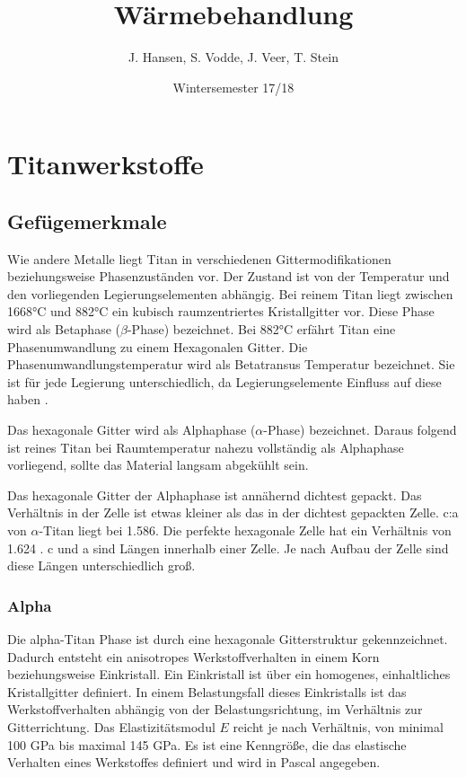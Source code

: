 \documentclass[a4paper, singlepage, 11pt]{tubsreprt}
\title{Wärmebehandlung}
\date{Wintersemester 17/18}
\author{J. Hansen, S. Vodde,
 J. Veer, T. Stein}
\begin{document}
\maketitle
\tableofcontents
\chapter{Titanwerkstoffe}

\section{Gefügemerkmale}
Wie andere Metalle liegt Titan in verschiedenen Gittermodifikationen beziehungsweise Phasenzuständen vor. Der Zustand ist von der Temperatur und den vorliegenden Legierungselementen abhängig. Bei reinem Titan liegt zwischen 1668°C und 882°C ein kubisch raumzentriertes Kristallgitter vor. Diese Phase wird als Betaphase ($\beta$-Phase) bezeichnet. Bei 882°C erfährt Titan eine Phasenumwandlung zu einem Hexagonalen Gitter. Die Phasenumwandlungstemperatur wird als Betatransus Temperatur bezeichnet. Sie ist für jede Legierung unterschiedlich, da Legierungselemente Einfluss auf diese haben \cite{Luetjering2007}.

Das hexagonale Gitter wird als Alphaphase ($\alpha$-Phase) bezeichnet. Daraus folgend ist reines Titan bei Raumtemperatur nahezu vollständig als Alphaphase vorliegend, sollte das Material langsam abgekühlt sein. 

Das hexagonale Gitter der Alphaphase ist annähernd dichtest gepackt. Das Verhältnis in der Zelle ist etwas kleiner als das in der dichtest gepackten Zelle. c:a von $\alpha$-Titan liegt bei 1.586. Die perfekte hexagonale Zelle hat ein Verhältnis von 1.624 \cite{Siemers2017}. c und a sind Längen innerhalb einer Zelle. Je nach Aufbau der Zelle sind diese Längen unterschiedlich groß.


\subsection{Alpha}
Die alpha-Titan Phase ist durch eine hexagonale Gitterstruktur gekennzeichnet. Dadurch entsteht ein anisotropes Werkstoffverhalten in einem Korn beziehungsweise Einkristall.
Ein Einkristall ist über ein homogenes, einhaltliches Kristallgitter definiert.
In einem Belastungsfall dieses Einkristalls ist das Werkstoffverhalten abhängig von der Belastungsrichtung, im Verhältnis zur Gitterrichtung. Das Elastizitätsmodul $E$ reicht je nach Verhältnis, von minimal 100 GPa bis maximal 145 GPa. Es ist eine Kenngröße, die das elastische Verhalten eines Werkstoffes definiert und wird in Pascal angegeben. 
\end{document}
